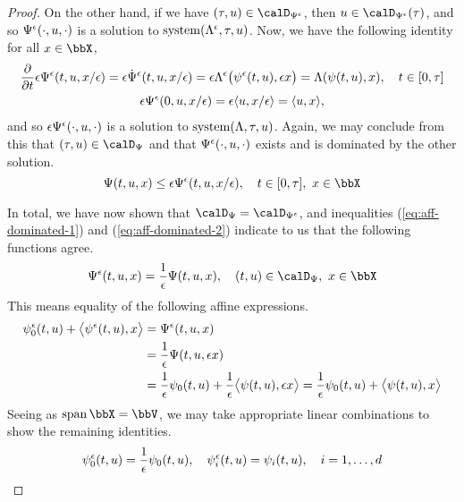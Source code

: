 \begin{proof}
  On the other hand, if we have $(\tau, \momentVar) \in \momentSpacee$, then $\momentVar \in \momentSpacee(\tau)$, and so $\Psi^\epsilon(\cdot, u, \cdot)$ is a solution to $\operatorname{system}(\Lambda^\epsilon, \tau, u)$.
  Now, we have the following identity for all $\stateVar \in \stateSpace$,
  \begin{gather*}
    \frac{\partial}{\partial t} \epsilon \Psi^\epsilon(t, u, x/\epsilon) = \epsilon \dot{\Psi}^\epsilon(t, u, x/\epsilon) = \epsilon \Lambda^\epsilon\big(\psi^\epsilon(t,u), \epsilon x\big) = \Lambda(\psi(t, u), x), \quad t \in [0,\tau] \\
    \epsilon\Psi^\epsilon(0,u, x/\epsilon) = \epsilon{\langle u, x/\epsilon \rangle} = {\langle u , x \rangle},
  \end{gather*}
  and so $\epsilon\Psi^\epsilon(\cdot,u,\cdot)$ is a solution to $\operatorname{system}(\Lambda, \tau, u)$.
  Again, we may conclude from this that $(\tau,\momentVar) \in \momentSpace$ and that $\Psi^\epsilon(\cdot, u, \cdot)$ exists and is dominated by the other solution.
  \begin{equation*}
    \label{eq:aff-dominated-2}
    \aff(t, \momentVar, \stateVar) \leq \epsilon \aff^\epsilon(t, \momentVar, \stateVar/\epsilon), \quad t \in [0,\tau], ~ \stateVar \in \stateSpace
  \end{equation*}

  In total, we have now shown that $\momentSpace = \momentSpacee$, and inequalities (\ref{eq:aff-dominated-1}) and (\ref{eq:aff-dominated-2}) indicate to us that the following functions agree.
  \begin{equation*}
    \aff^\epsilon(t, \momentVar, \stateVar) = \frac1\epsilon \aff(t, \momentVar, \stateVar), \quad (t, \momentVar) \in \momentSpace, ~ \stateVar \in \stateSpace
  \end{equation*}
  This means equality of the following affine expressions.
  \begin{align*}
    \psi^\epsilon_0(t, u) + {\big\langle \psi^\epsilon(t,u) , x \big\rangle} 
    &= \Psi^\epsilon(t, u, x) \\
    &= \frac1\epsilon \Psi(t, u, \epsilon x) \\
    &= \frac1\epsilon \psi_0(t, u) + \frac1\epsilon {\big\langle \psi(t, u) , \epsilon x\big\rangle}
    = \frac1\epsilon \psi_0(t, u) + {\big\langle \psi(t, u) , x \big\rangle}
  \end{align*}
  Seeing as $\operatorname{span}\stateSpace = \vecSpace$, we may take appropriate linear combinations to show the remaining identities.
  \begin{equation*}
    \psi^\epsilon_0(t, u) = \frac1\epsilon\psi_0(t,u), \quad
    \psi^\epsilon_i(t, u) = \psi_i(t,u), \quad i = 1, \ldots, d
  \end{equation*}
\end{proof}
